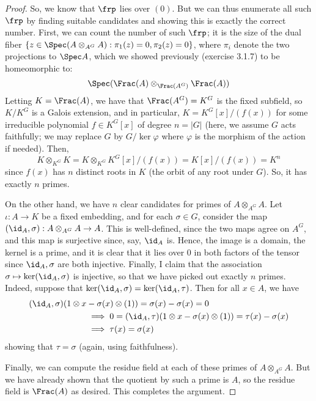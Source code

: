 \begin{proof}
	So, we know that $\frp$ lies over $(0)$. But we can thus enumerate all such $\frp$ by finding suitable candidates and showing this is exactly the correct number. First, we can count the number of such $\frp$; it is the size of the dual fiber $\{ z \in \Spec(A \otimes_{A^G} A) : \pi_1(z) = 0, \pi_2(z) = 0 \}$, where $\pi_i$ denote the two projections to $\Spec A$, which we showed previously (exercise 3.1.7) to be homeomorphic to:
	\[ \Spec(\Frac(A) \otimes_{\Frac(A^G)} \Frac(A)) \]
	Letting $K = \Frac(A)$, we have that $\Frac(A^G) = K^G$ is the fixed subfield, so $K/K^G$ is a Galois extension, and in particular, $K = K^G[x]/(f(x))$ for some irreducible polynomial $f \in K^G[x]$ of degree $n = |G|$ (here, we assume $G$ acts faithfully; we may replace $G$ by $G/\ker\varphi$ where $\varphi$ is the morphism of the action if needed). Then,
	\[ K \otimes_{K^G} K = K \otimes_{K^G} K^G[x]/(f(x)) = K[x]/(f(x)) = K^n \]
	since $f(x)$ has $n$ distinct roots in $K$ (the orbit of any root under $G$). So, it has exactly $n$ primes.
	
	On the other hand, we have $n$ clear candidates for primes of $A \otimes_{A^G} A$. Let $\iota : A \to K$ be a fixed embedding, and for each $\sigma \in G$, consider the map $(\id_A,\sigma) : A \otimes_{A^G} A \to A$. This is well-defined, since the two maps agree on $A^G$, and this map is surjective since, say, $\id_A$ is. Hence, the image is a domain, the kernel is a prime, and it is clear that it lies over $0$ in both factors of the tensor since $\id_A,\sigma$ are both injective. Finally, I claim that the association $\sigma \mapsto \ker(\id_A,\sigma)$ is injective, so that we have picked out exactly $n$ primes. Indeed, suppose that $\ker(\id_A,\sigma) = \ker(\id_A,\tau)$. Then for all $x \in A$, we have
	\begin{align*}
		(\id_A,\sigma)(1 \otimes x &- \sigma(x) \otimes(1)) = \sigma(x) - \sigma(x) = 0 \\
		&\implies 0 = (\id_A,\tau)(1 \otimes x - \sigma(x) \otimes(1)) = \tau(x) - \sigma(x) \\
		&\implies \tau(x) = \sigma(x)
	\end{align*}
	showing that $\tau = \sigma$ (again, using faithfulness).
	
	Finally, we can compute the residue field at each of these primes of $A \otimes_{A^G} A$. But we have already shown that the quotient by such a prime is $A$, so the residue field is $\Frac(A)$ as desired. This completes the argument.
\end{proof}

